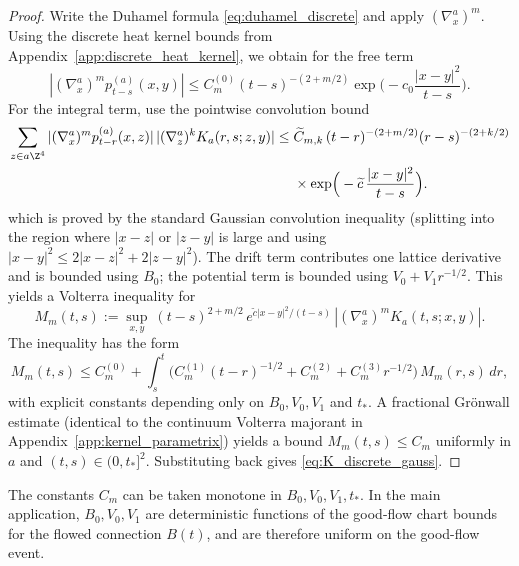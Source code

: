 \begin{proof}
Write the Duhamel formula \eqref{eq:duhamel_discrete} and apply $(\nabla^a_x)^m$.
Using the discrete heat kernel bounds from Appendix~\ref{app:discrete_heat_kernel}, we obtain for the free term
\[
|(\nabla^a_x)^m p^{(a)}_{t-s}(x,y)|
\le C^{(0)}_m (t-s)^{-(2+m/2)} \exp\!\Big(-c_0\frac{|x-y|^2}{t-s}\Big).
\]
For the integral term, use the pointwise convolution bound
\[
\begin{aligned}
\sum_{z\in a\Z^4} |(\nabla^a_x)^m p^{(a)}_{t-r}(x,z)|\,
|(\nabla^a_z)^k K_a(r,s;z,y)|
\le{}&
\widetilde C_{m,k}\,(t-r)^{-(2+m/2)}(r-s)^{-(2+k/2)}\\
&\times \exp\!\Big(-\widetilde c\,\frac{|x-y|^2}{t-s}\Big).
\end{aligned}
\]
which is proved by the standard Gaussian convolution inequality (splitting into the region where $|x-z|$ or $|z-y|$ is large and using $|x-y|^2\le 2|x-z|^2+2|z-y|^2$).
The drift term contributes one lattice derivative and is bounded using $B_0$; the potential term is bounded using $V_0+V_1 r^{-1/2}$.
This yields a Volterra inequality for
\[
M_m(t,s):=\sup_{x,y}\ (t-s)^{2+m/2}\,e^{\widetilde c |x-y|^2/(t-s)}\,|(\nabla^a_x)^m K_a(t,s;x,y)|.
\]
The inequality has the form
\[
M_m(t,s)\le C_m^{(0)}+\int_s^t \Big( C_m^{(1)}(t-r)^{-1/2}+C_m^{(2)}+C_m^{(3)} r^{-1/2}\Big)\,M_m(r,s)\,dr,
\]
with explicit constants depending only on $B_0,V_0,V_1$ and $t_\ast$.
A fractional Gr\"onwall estimate (identical to the continuum Volterra majorant in Appendix~\ref{app:kernel_parametrix}) yields a bound
$M_m(t,s)\le C_m$ uniformly in $a$ and $(t,s)\in(0,t_\ast]^2$.
Substituting back gives \eqref{eq:K_discrete_gauss}.
\end{proof}

\begin{remark}
The constants $C_m$ can be taken monotone in $B_0,V_0,V_1,t_\ast$.
In the main application, $B_0,V_0,V_1$ are deterministic functions of the good-flow chart bounds for the flowed connection $B(t)$,
and are therefore uniform on the good-flow event.
\end{remark}
